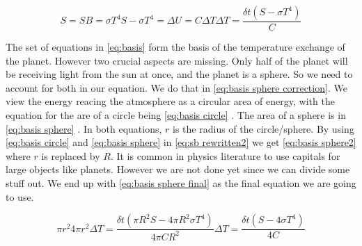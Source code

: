 \begin{subequations}
    \begin{equation}
        S = SB = \sigma T^4
        \label{eq:stefan-boltzmann}
    \end{equation}
    \begin{equation}
        S - \sigma T^4 = \Delta U = C \Delta T
        \label{eq:sb rewritten}
    \end{equation}
    \begin{equation}
        \Delta T = \frac{\delta t(S - \sigma T^4)}{C}
        \label{eq:sb rewritten2}
    \end{equation}
    \label{eq:basis}
\end{subequations}

The set of equations in \autoref{eq:basis} form the basis of the temperature exchange of the planet. However two crucial aspects are missing. Only half of the planet will be receiving light from 
the sun at once, and the planet is a sphere. So we need to account for both in our equation. We do that in \autoref{eq:basis sphere correction}. We view the energy reacing the atmosphere as a 
circular area of energy, with the equation for the are of a circle being \autoref{eq:basis circle} \cite{areaCircle}. The area of a sphere is in \autoref{eq:basis sphere} \cite{areaSphere}. In 
both equations, $r$ is the radius of the circle/sphere. By using \autoref{eq:basis circle} and \autoref{eq:basis sphere} in \autoref{eq:sb rewritten2} we get \autoref{eq:basis sphere2} where 
$r$ is replaced by $R$. It is common in physics literature to use capitals for large objects like planets. However we are not done yet since we can divide some stuff out. We end up with 
\autoref{eq:basis sphere final} as the final equation we are going to use.

\begin{subequations}
    \begin{equation}
        \pi r^2
        \label{eq:basis circle}
    \end{equation}
    \begin{equation}
        4 \pi r^2
        \label{eq:basis sphere}
    \end{equation}
    \begin{equation}
        \Delta T = \frac{\delta t (\pi R^2S - 4\pi R^2\sigma T^4)}{4\pi CR^2}
        \label{eq:basis sphere2}
    \end{equation}
    \begin{equation}
        \Delta T = \frac{\delta t (S - 4\sigma T^4)}{4C}
        \label{eq:basis sphere final}
    \end{equation}
    \label{eq:basis sphere correction}
\end{subequations}

